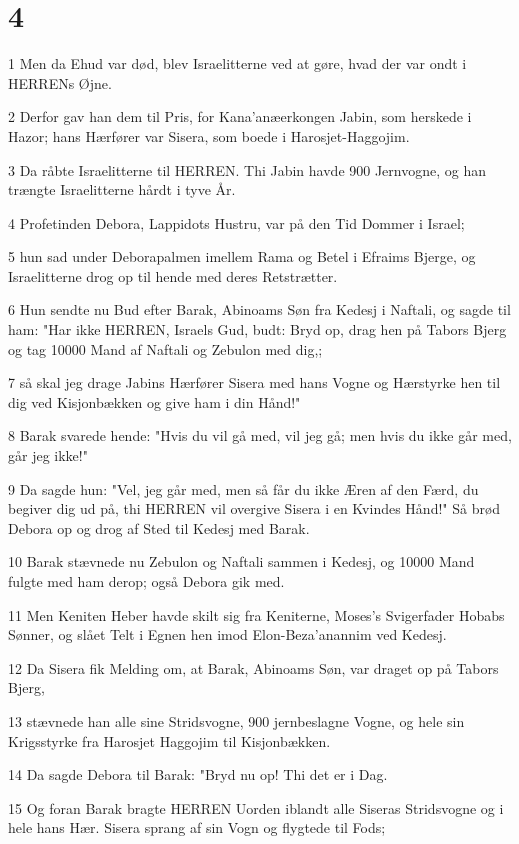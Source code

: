 \chapter{4}

\par 1 Men da Ehud var død, blev Israelitterne ved at gøre, hvad der var ondt i HERRENs Øjne.
\par 2 Derfor gav han dem til Pris, for Kana'anæerkongen Jabin, som herskede i Hazor; hans Hærfører var Sisera, som boede i Harosjet-Haggojim.
\par 3 Da råbte Israelitterne til HERREN. Thi Jabin havde 900 Jernvogne, og han trængte Israelitterne hårdt i tyve År.
\par 4 Profetinden Debora, Lappidots Hustru, var på den Tid Dommer i Israel;
\par 5 hun sad under Deborapalmen imellem Rama og Betel i Efraims Bjerge, og Israelitterne drog op til hende med deres Retstrætter.
\par 6 Hun sendte nu Bud efter Barak, Abinoams Søn fra Kedesj i Naftali, og sagde til ham: "Har ikke HERREN, Israels Gud, budt: Bryd op, drag hen på Tabors Bjerg og tag 10000 Mand af Naftali og Zebulon med dig,;
\par 7 så skal jeg drage Jabins Hærfører Sisera med hans Vogne og Hærstyrke hen til dig ved Kisjonbækken og give ham i din Hånd!"
\par 8 Barak svarede hende: "Hvis du vil gå med, vil jeg gå; men hvis du ikke går med, går jeg ikke!"
\par 9 Da sagde hun: "Vel, jeg går med, men så får du ikke Æren af den Færd, du begiver dig ud på, thi HERREN vil overgive Sisera i en Kvindes Hånd!" Så brød Debora op og drog af Sted til Kedesj med Barak.
\par 10 Barak stævnede nu Zebulon og Naftali sammen i Kedesj, og 10000 Mand fulgte med ham derop; også Debora gik med.
\par 11 Men Keniten Heber havde skilt sig fra Keniterne, Moses's Svigerfader Hobabs Sønner, og slået Telt i Egnen hen imod Elon-Beza'anannim ved Kedesj.
\par 12 Da Sisera fik Melding om, at Barak, Abinoams Søn, var draget op på Tabors Bjerg,
\par 13 stævnede han alle sine Stridsvogne, 900 jernbeslagne Vogne, og hele sin Krigsstyrke fra Harosjet Haggojim til Kisjonbækken.
\par 14 Da sagde Debora til Barak: "Bryd nu op! Thi det er i Dag.
\par 15 Og foran Barak bragte HERREN Uorden iblandt alle Siseras Stridsvogne og i hele hans Hær. Sisera sprang af sin Vogn og flygtede til Fods;
